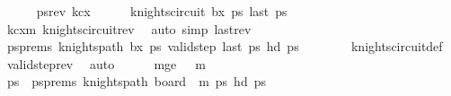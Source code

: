 \begin{isabellebody}
\isanewline
\ \ \ \ \isamarkupfalse%
\ {\isacharquery}{\kern0pt}psrev\ kc{}x{}{\isachardoublequoteclose}\isanewline
\ \ \ \ \isamarkupfalse%
\ {\isachardoublequoteopen}knights{\isacharunderscore}{\kern0pt}circuit\ b{}x{}\ {\isacharquery}{\kern0pt}ps\ {\isachardoublequoteopen}last\ {\isacharquery}{\kern0pt}ps\ {\isacharequal}{\kern0pt}\ {\isacharparenleft}{\kern0pt}{}{\isacharcomma}{\kern0pt}{}{\isacharparenright}{\kern0pt}{\isachardoublequoteclose}\isanewline
\ \ \ \ \ \ \isamarkupfalse%
\ kc{\isacharunderscore}{\kern0pt}{}xm\ knights{\isacharunderscore}{\kern0pt}circuit{\isacharunderscore}{\kern0pt}rev\ \isamarkupfalse%
\ {\isacharparenleft}{\kern0pt}auto\ simp{\isacharcolon}{\kern0pt}\ last{\isacharunderscore}{\kern0pt}rev{\isacharparenright}{\kern0pt}\isanewline
\ \ \ \ \isamarkupfalse%
\ \isamarkupfalse%
\ psprems{\isacharcolon}{\kern0pt}\ {\isachardoublequoteopen}knights{\isacharunderscore}{\kern0pt}path\ b{}x{}\ {\isacharquery}{\kern0pt}ps\ {\isachardoublequoteopen}valid{\isacharunderscore}{\kern0pt}step\ {\isacharparenleft}{\kern0pt}last\ {\isacharquery}{\kern0pt}ps\ {\isacharparenleft}{\kern0pt}hd\ {\isacharquery}{\kern0pt}ps\isanewline
\ \ \ \ \ \ \isamarkupfalse%
\ knights{\isacharunderscore}{\kern0pt}circuit{\isacharunderscore}{\kern0pt}def\ \isamarkupfalse%
\ valid{\isacharunderscore}{\kern0pt}step{\isacharunderscore}{\kern0pt}rev\ \isamarkupfalse%
\ auto\isanewline
\ \ \ \ \isamarkupfalse%
\ m{\isacharunderscore}{\kern0pt}ge{\isacharcolon}{\kern0pt}\ {\isachardoublequoteopen}{}\ {\isasymle}\ m{\isacharminus}{\kern0pt}{}{\isachardoublequoteclose}\ \isanewline
\ \ \ \ \isamarkupfalse%
\ \isamarkupfalse%
\ ps\ \ ps{}{\isacharunderscore}{\kern0pt}prems{\isacharcolon}{\kern0pt}\ {\isachardoublequoteopen}knights{\isacharunderscore}{\kern0pt}path\ {\isacharparenleft}{\kern0pt}board\ {}\ {\isacharparenleft}{\kern0pt}m{\isacharminus}{\kern0pt}{}{\isacharparenright}{\kern0pt}{\isacharparenright}{\kern0pt}\ ps\ {\isachardoublequoteopen}hd\ ps\ {\isacharequal}{\kern0pt}\ {\isacharparenleft}{\kern0pt}{}{\isacharcomma}{\kern0pt}{}{\isacharparenright}{\kern0pt}{\isachardoublequoteclose}\ \isanewline

\end{isabellebody}
